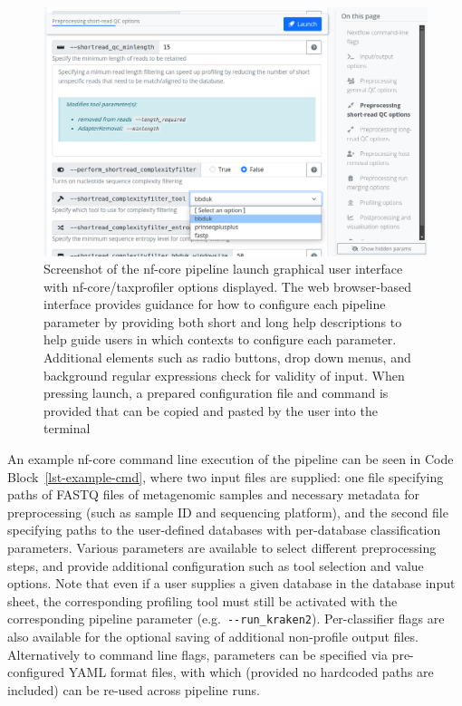 \documentclass[
]{article}
\begin{document}
\begin{figure}

{\centering \includegraphics{taxprofiler_launchpage.png}

}

\caption{\label{fig-launch-page}Screenshot of the nf-core pipeline
launch graphical user interface with nf-core/taxprofiler options
displayed. The web browser-based interface provides guidance for how to
configure each pipeline parameter by providing both short and long help
descriptions to help guide users in which contexts to configure each
parameter. Additional elements such as radio buttons, drop down menus,
and background regular expressions check for validity of input. When
pressing launch, a prepared configuration file and command is provided
that can be copied and pasted by the user into the terminal}

\end{figure}

An example nf-core command line execution of the pipeline can be seen in
Code Block~\ref{lst-example-cmd}, where two input files are supplied:
one file specifying paths of FASTQ files of metagenomic samples and
necessary metadata for preprocessing (such as sample ID and sequencing
platform), and the second file specifying paths to the user-defined
databases with per-database classification parameters. Various
parameters are available to select different preprocessing steps, and
provide additional configuration such as tool selection and value
options. Note that even if a user supplies a given database in the
database input sheet, the corresponding profiling tool must still be
activated with the corresponding pipeline parameter
(e.g.~\texttt{-\/-run\_kraken2}). Per-classifier flags are also
available for the optional saving of additional non-profile output
files. Alternatively to command line flags, parameters can be specified
via pre-configured YAML format files, with which (provided no hardcoded
paths are included) can be re-used across pipeline runs.
\end{document}
